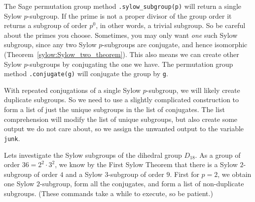 %
The Sage permutation group method \verb?.sylow_subgroup(p)? will return a single Sylow $p$-subgroup.  If the prime is not a proper divisor of the group order it returns a subgroup of order $p^0$, in other words, a trivial subgroup.  So be careful about the primes you choose.  Sometimes, you may only want \emph{one} such Sylow subgroup, since any two Sylow $p$-subgroups are conjugate, and hence isomorphic (Theorem~\ref{sylow:Sylow_two_theorem}).  This also means we can create other Sylow $p$-subgroups by conjugating the one we have.  The permutation group method \verb?.conjugate(g)? will conjugate the group by \verb?g?.\par
%
With repeated conjugations of a single Sylow $p$-subgroup, we will likely create duplicate subgroups.  So we need to use a slightly complicated construction to form a list of just the unique subgroups in the list of conjugates.  The list comprehension will modify the list of unique subgroups, but also create some output we do not care about, so we assign the unwanted output to the variable \verb?junk?.\par
%
Lets investigate the Sylow subgroups of the dihedral group $D_{18}$.  As a group of order $36=2^2\cdot 3^2$, we know by the First Sylow Theorem that there is a Sylow $2$-subgroup of order $4$ and a Sylow $3$-subgroup of order $9$.  First for $p=2$, we obtain one Sylow $2$-subgroup, form all the conjugates, and form a list of non-duplicate subgroups.  (These commands take a while to execute, so be patient.)
%
